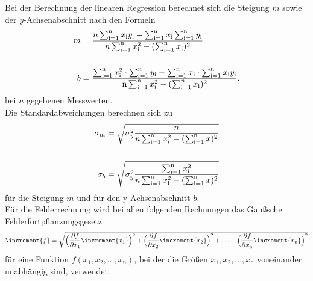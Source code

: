 Bei der Berechnung der linearen Regression berechnet sich die Steigung $m$ sowie der $y$-Achsenabschnitt nach den Formeln
\begin{align}
  m &= \frac{ n \sum_{\text{i}=1}^\text{n} x_\text{i} y_\text{i} - \sum_{\text{i}=1}^\text{n} x_\text{i} \sum_{\text{i}=1}^\text{n} y_\text{i} }{n\sum_{\text{i}=1}^\text{n} x_{\text{i}}^2 - ( \sum_{\text{i}=1}^\text{n} x_\text{i} )^2}  \label{eqn:2}\\
  \notag\\
  b &= \frac{ \sum_{\text{i}=1}^\text{n} x_\text{i}^2 \cdot \sum_{\text{i}=1}^\text{n} y_\text{i} - \sum_{\text{i}=1}^\text{n} x_\text{i} \cdot \sum_{\text{i}=1}^\text{n} x_\text{i} y_\text{i}}{\text{n}\sum_{\text{i}=1}^\text{n} x_\text{i}^2 - ( \sum_{\text{i}=1}^n x_\text{i} )^2},
  \label{eqn:3}
\end{align}
bei $n$ gegebenen Messwerten.
\\
Die Standardabweichungen berechnen sich zu
\begin{align}
  \sigma_m &= \sqrt{ \sigma_y^2 \frac{n}{n \sum_{\text{i}=1}^\text{n} x_\text{i}^2 - (\sum_{\text{i}=1}^\text{n} x)^2} }
  \label{eqn:4}\\
  \notag\\
  \sigma_b &= \sqrt{ \sigma_y^2 \frac{\sum_{\text{i}=1}^\text{n} x_\text{i}^2}{n \sum_{\text{i}=1}^\text{n} x_\text{i}^2 - (\sum_{\text{i}=1}^\text{n} x)^2} }
  \label{eqn:5}
\end{align}
für die Steigung $m$ und für den y-Achsenabschnitt $b$.\cite{fehler}\\
Für die Fehlerrechnung wird bei allen folgenden Rechnungen das Gaußsche Fehlerfortpflanzungsgesetz
\begin{equation}
\increment{f} = \sqrt{\Bigl(\frac{\partial f}{\partial x_1}\increment{x_1}\Bigr)^2 + \Bigl(\frac{\partial f}{\partial x_2}\increment{x_2}\Bigr)^2 + \dotsc + \Bigl(\frac{\partial f}{\partial x_\text{n}}\increment{x_\text{n}}\Bigr)^2}
\end{equation}
für eine Funktion $f(x_1,x_2, \dotsc ,x_\text{n})$, bei der die Größen $x_1, x_2, \dotsc , x_\text{n}$ voneinander unabhängig sind, verwendet.



